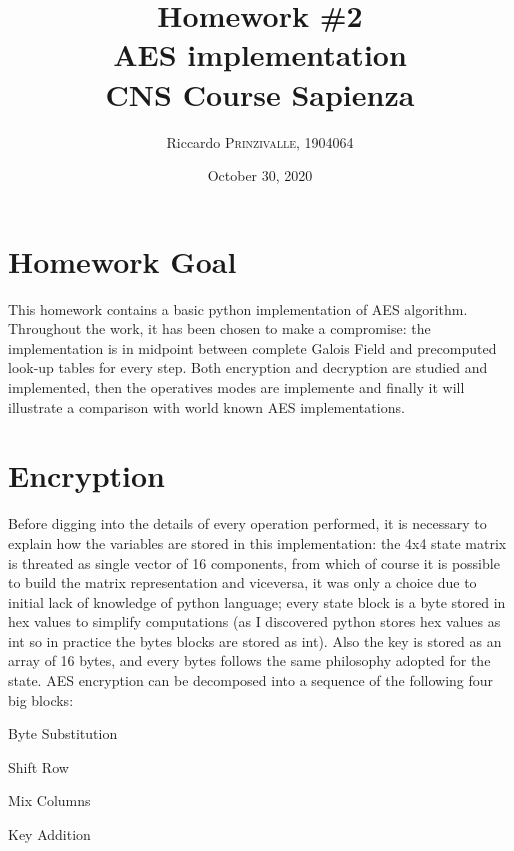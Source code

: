 \documentclass{article}
\title{Homework \#2 \\AES implementation \\[0.2em]\small{}CNS Course Sapienza} %
\author{Riccardo \textsc{Prinzivalle}, 1904064} %
\date{October 30, 2020} %
\begin{document}
\maketitle %


\section{Homework Goal}

This homework contains a basic python implementation of AES algorithm. Throughout the work, it has been chosen to make a compromise: the implementation is in midpoint between complete Galois Field and precomputed look-up tables for every step. Both encryption and decryption are studied and implemented, then the operatives modes are implemente and finally it will illustrate a comparison with world known AES implementations.

\section{Encryption}
Before digging into the details of every operation performed, it is necessary to explain how the variables are stored in this implementation: the 4x4 state matrix is threated as single vector of 16 components, from which of course it is possible to build the matrix representation and viceversa, it was only a choice due to initial lack of knowledge of python language; every state block is a byte stored in hex values to simplify computations (as I discovered python stores hex values as int so in practice the bytes blocks are stored as int). Also the key is stored as an array of 16 bytes, and every bytes follows the same philosophy adopted for the state. \newline
AES encryption can be decomposed into a sequence of the following four big blocks:  

\begin{enumerate}
\begin{item}
Byte Substitution
\end{item}
\begin{item}
Shift Row 
\end{item}
\begin{item}
Mix Columns
\end{item}
\begin{item}
Key Addition 
\end{item}
\end{enumerate}
\end{document}
